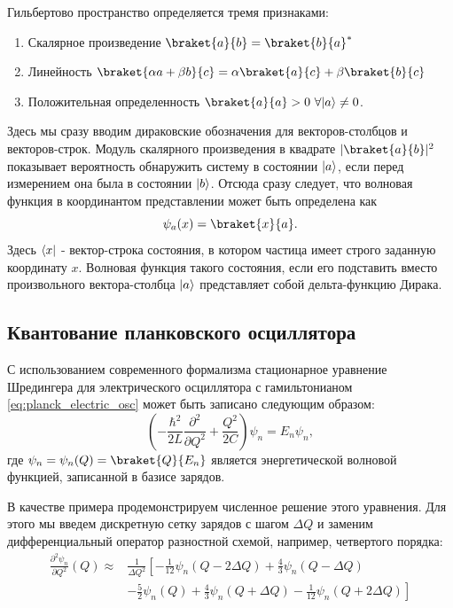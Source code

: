 \documentclass[14pt, a4paper]{extreport}
\DeclarePairedDelimiter\bra{\langle}{\rvert}
\DeclarePairedDelimiter\ket{\lvert}{\rangle}
\numberwithin{equation}{section}
\begin{document}
Гильбертово пространство определяется тремя признаками:
\begin{enumerate}
	\item Скалярное произведение $\braket{a}{b} = \braket{b}{a}^*$
	\item Линейность $\braket{\alpha a + \beta b}{c} = \alpha\braket{a}{c} + \beta\braket{b}{c}$
	\item Положительная определенность $ \braket{a}{a} >0 \  \forall \ket{a} \neq 0$. 
\end{enumerate}

Здесь мы сразу вводим дираковские обозначения для векторов-столбцов и векторов-строк. Модуль скалярного произведения в квадрате $|\braket{a}{b}|^2$ показывает вероятность обнаружить систему в состоянии $\ket{a}$, если перед измерением она была в состоянии $\ket{b}$. Отсюда сразу следует, что волновая функция в координантом представлении может быть определена как
\begin{equation}
	\psi_a(x) = \braket{x}{a}.
\end{equation}
Здесь $\bra{x}$ - вектор-строка состояния, в котором частица имеет строго заданную координату $x$. Волновая функция такого состояния, если его подставить вместо произвольного вектора-столбца $\ket{a}$ представляет собой дельта-функцию Дирака.

\subsection{Квантование планковского осциллятора}

С использованием современного формализма стационарное уравнение Шредингера для электрического осциллятора с гамильтонианом \eqref{eq:planck_electric_osc} может быть записано следующим образом:
\begin{equation}
	\left(-\frac{\hbar^2}{2 L} \frac{\partial^2 }{\partial Q^2} + \frac{Q^2}{2 C}\right)\psi_n = E_n \psi_n,\label{eq:shroedinger_planck}
\end{equation}
где $\psi_n = \psi_n(Q) = \braket{Q}{E_n}$ является энергетической волновой функцией, записанной в базисе зарядов. 

В качестве примера продемонстрируем численное решение этого уравнения. Для этого мы введем дискретную сетку зарядов с шагом $\Delta Q$ и заменим дифференциальный оператор разностной схемой, например, четвертого порядка:
\begin{equation}
\begin{aligned}
	\frac{\partial^2 \psi_n}{\partial Q^2}(Q) \approx &\frac{1}{\Delta Q^2}\left[-\frac{1}{12} \psi_n(Q - 2 \Delta Q)
+\frac{4}{3} \psi_n(Q - \Delta Q)\right.\\
&\left.-\frac{5}{2} \psi_n(Q)
+\frac{4}{3} \psi_n(Q + \Delta Q)
-\frac{1}{12} \psi_n(Q + 2 \Delta Q)\right]
\end{aligned}
\end{equation}
\end{document}
